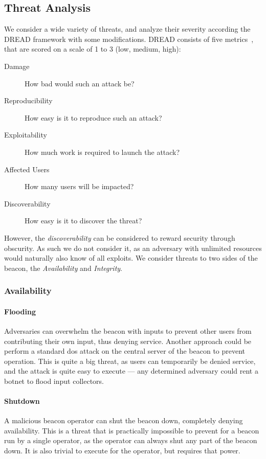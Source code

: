 \subsection{Threat Analysis}
We consider a wide variety of threats, and analyze their severity according the DREAD framework with some modifications. DREAD consists of five metrics~\cite{dread}, that are scored on a scale of 1 to 3 (low, medium, high):
\begin{description}
    \item [Damage] How bad would such an attack be?
    \item [Reproducibility] How easy is it to reproduce such an attack?
    \item [Exploitability] How much work is required to launch the attack?
    \item [Affected Users] How many users will be impacted?
    \item [Discoverability] How easy is it to discover the threat?
\end{description}

However, the \emph{discoverability} can be considered to reward security through obscurity. As such we do not consider it, as an adversary with unlimited resources would naturally also know of all exploits.
We consider threats to two sides of the beacon, the \emph{Availability} and \emph{Integrity}.

\subsubsection{Availability}

\paragraph{Flooding} Adversaries can overwhelm the beacon with inputs to prevent other users from contributing their own input, thus denying service. Another approach could be perform a standard \gls{dos} attack on the central server of the beacon to prevent operation. This is quite a big threat, as users can temporarily be denied service, and the attack is quite easy to execute --- any determined adversary could rent a botnet to flood input collectors.    %
\paragraph{Shutdown} A malicious beacon operator can shut the beacon down, completely denying availability. This is a threat that is practically impossible to prevent for a beacon run by a single operator, as the operator can always shut any part of the beacon down. It is also trivial to execute for the operator, but requires that power.
